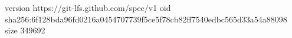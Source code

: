 version https://git-lfs.github.com/spec/v1
oid sha256:6f128bda96fd0216a0454707739f5ce5f78cb82ff7540edbc565d33a54a88098
size 349692
